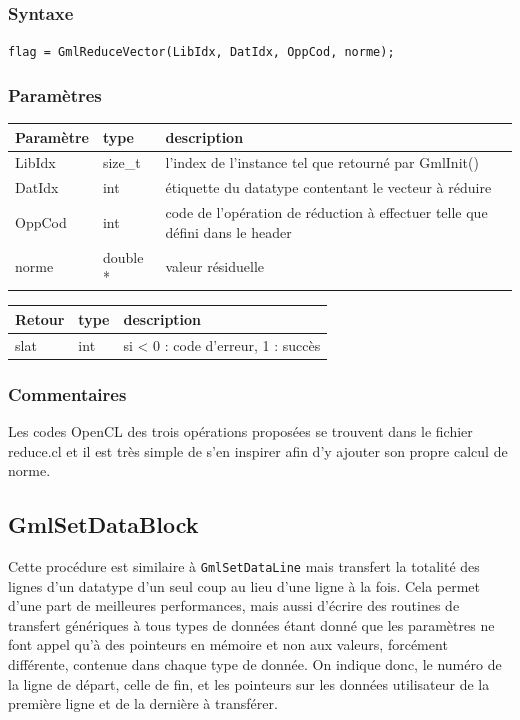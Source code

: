 \documentclass[a4paper,12pt]{article}
\begin{document}
\subsubsection*{Syntaxe}

{\tt flag = GmlReduceVector(LibIdx, DatIdx, OppCod, norme);}

\subsubsection*{Paramètres}

\begin{tabular}{|m{2cm}|m{1.5cm}|m{10.5cm}|}
\hline
Paramètre  & type     & description \\
\hline
LibIdx     & size\_t  & l'index de l'instance tel que retourné par GmlInit() \\
\hline
DatIdx     & int      & étiquette du datatype contentant le vecteur à réduire  \\
\hline
OppCod     & int      & code de l'opération de réduction à effectuer telle que défini dans le header \\
\hline
norme      & double * & valeur résiduelle \\
\hline
\end{tabular}

\medskip

\begin{tabular}{|m{2cm}|m{1.5cm}|m{10.5cm}|}
\hline
Retour     & type   & description \\
\hline
slat       & int    & si < 0 : code d'erreur, 1 : succès  \\
\hline
\end{tabular}

\subsubsection*{Commentaires}
Les codes OpenCL des trois opérations proposées se trouvent dans le fichier reduce.cl et il est très simple de s'en inspirer afin d'y ajouter son propre calcul de norme.


\subsection{GmlSetDataBlock}

Cette procédure est similaire à {\tt GmlSetDataLine} mais transfert la totalité des lignes d'un datatype d'un seul coup au lieu d'une ligne à la fois. Cela permet d'une part de meilleures performances, mais aussi d'écrire des routines de transfert génériques à tous types de données étant donné que les paramètres ne font appel qu'à des pointeurs en mémoire et non aux valeurs, forcément différente, contenue dans chaque type de donnée.
On indique donc, le numéro de la ligne de départ, celle de fin, et les pointeurs sur les données utilisateur de la première ligne et de la dernière à transférer.
\end{document}
